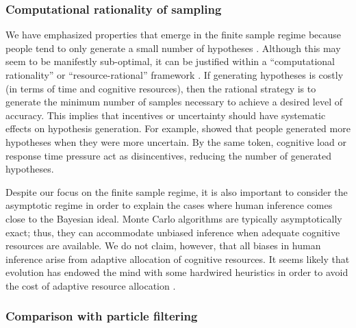 \subsubsection{Computational rationality of sampling}

We have emphasized properties that emerge in the finite sample regime because people tend to only generate a small number of hypotheses \citep{klein1999,ross96,Gettys1979,weber1993,dougherty1997}. Although this may seem to be manifestly sub-optimal, it can be justified within a ``computational rationality'' or ``resource-rational'' framework \citep{Vul2014,griffiths2015,Gershman2015,schulz2016simple}. If generating hypotheses is costly (in terms of time and cognitive resources), then the rational strategy is to generate the minimum number of samples necessary to achieve a desired level of accuracy. This implies that incentives or uncertainty should have systematic effects on hypothesis generation. For example, \citet{hamrick2015think} showed that people generated more hypotheses when they were more uncertain. By the same token, cognitive load \citep{sprenger2011} or response time pressure \citep{Dougherty2003} act as disincentives, reducing the number of generated hypotheses.

Despite our focus on the finite sample regime, it is also important to consider the asymptotic regime in order to explain the cases where human inference comes close to the Bayesian ideal. Monte Carlo algorithms are typically asymptotically exact; thus, they can accommodate unbiased inference when adequate cognitive resources are available. We do not claim, however, that all biases in human inference arise from adaptive allocation of cognitive resources. It seems likely that evolution has endowed the mind with some hardwired heuristics in order to avoid the cost of adaptive resource allocation \citep{gigerenzer09}.

\subsubsection{Comparison with particle filtering}

